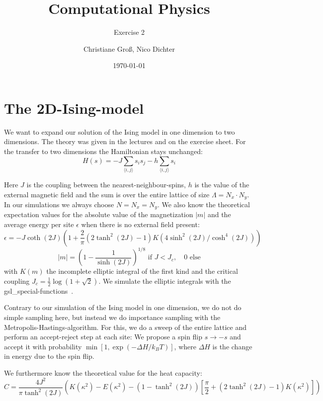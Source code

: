 \documentclass{scrartcl}
\title{Computational Physics}
\subtitle{Exercise 2}
\date{\today}
\author{Christiane Groß, Nico Dichter}
\begin{document}
	\maketitle
\section{The 2D-Ising-model}
We want to expand our solution of the Ising model in one dimension to two dimensions. The theory was given in the lectures and on the exercise sheet. For the transfer to two dimensions the Hamiltonian stays unchanged: 
\begin{equation}
H(s)=-J\sum_{\langle i,j\rangle }s_is_j-h\sum_{\langle i,j\rangle }s_i
\label{eq:hamiltonianising}
\end{equation}

Here $J$ is the coupling between the nearest-neighbour-spins, $h$ is the value of the external magnetic field and the sum is over the entire lattice of size $\Lambda=N_x \cdot N_y$. In our simulations we always choose $N=N_x=N_y$.
We also know the theoretical expectation values for the  absolute value of the magnetization $|m|$ and the average energy per site $\epsilon$ when there is no external field present:
\begin{equation}
\epsilon=-J\coth(2J)\left( 1+\frac{2}{\pi}(2\tanh^2(2J)-1)K(4\sinh^2(2J)/\cosh^4(2J))\right) 
\end{equation}
\begin{equation}
|m|=\left( 1-\frac{1}{\sinh(2J)}\right)^{1/8} \text{ if } J<J_c,\quad 0 \text{ else}   
\end{equation}
 with $K(m)$ the incomplete elliptic integral of the first kind and the critical coupling $J_c=\frac{1}{2}\log(1+\sqrt{2})$. We simulate the elliptic integrals with the gsl\_special-functions~\cite{gsldoc_sf}.
 
 Contrary to our simulation of the Ising model in one dimension, we do not do simple sampling here, but instead we do importance sampling with the Metropolis-Hastings-algorithm. For this, we do a sweep of the entire lattice and perform an accept-reject step at each site: We propose a spin flip $s\rightarrow-s$ and accept it with probability $\min \left[1, \exp(-\Delta H/k_BT)\right]$, where $\Delta H$ is the change in energy due to the spin flip.  

We furthermore know the theoretical value for the heat capacity:
\begin{equation}
C=\frac{4J^2}{\pi\tanh^2(2J)}\left( K(\kappa^2)-E(\kappa^2)-\left(1-\tanh^2(2J)\right)\left[\frac{\pi}{2} +\left(2\tanh^2(2J)-1\right)K(\kappa^2)\right] \right)
\end{equation}
\end{document}

